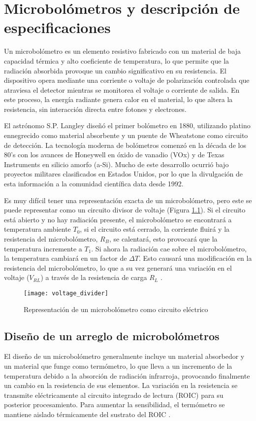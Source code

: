 \chapter{Microbolómetros y descripción de especificaciones}
Un microbolómetro es un elemento resistivo fabricado con un material de baja capacidad térmica y alto coeficiente de temperatura, lo que permite que la radiación absorbida provoque un cambio significativo en su resistencia. El dispositivo opera mediante una corriente o voltaje de polarización controlada que atraviesa el detector mientras se monitorea el voltaje o corriente de salida. En este proceso, la energía radiante genera calor en el material, lo que altera la resistencia, sin interacción directa entre fotones y electrones.


El astrónomo S.P. Langley diseñó el primer bolómetro en 1880, utilizando platino ennegrecido como material absorbente y un puente de Wheatstone como circuito de detección. La tecnología moderna de bolómetros comenzó en la década de los 80's con los avances de Honeywell en óxido de vanadio (VOx) y de Texas Instruments en silicio amorfo (a-Si). Mucho de este desarrollo ocurrió bajo proyectos militares clasificados en Estados Unidos, por lo que la divulgación de esta información a la comunidad científica data desde 1992.


Es muy difícil tener una representación exacta de un microbolómetro, pero este se puede representar como un circuito divisor de voltaje (Figura \ref{fig:voltage_divider}). Si el circuito está abierto y no hay radiación presente, el microbolómetro se encontrará a temperatura ambiente $T_{0}$, si el circuito está cerrado, la corriente fluirá y la resistencia del microbolómetro, $R_{B}$, se calentará, esto provocará que la temperatura incremente a $T_{1}$. Si ahora la radiación cae sobre el microbolómetro, la temperatura cambiará en un factor de $\Delta T$. Esto causará una modificación en la resistencia del microbolómetro, lo que a su vez generará una variación en el voltaje ($V_{RL}$) a través de la resistencia de carga $R_{L}$ \cite{Rogalski}. 

            \begin{figure}[hbtp]
                \centering
                \texttt{[image: voltage\_divider]}
                \caption{Representación de un microbolómetro como circuito eléctrico}
                \label{fig:voltage_divider}
            \end{figure} 

\section{Diseño de un arreglo de microbolómetros}
El diseño de un microbolómetro generalmente incluye un material absorbedor y un material que funge como termómetro, lo que lleva a un incremento de la temperatura debido a la absorción de radiación infrarroja, provocando finalmente un cambio en la resistencia de sus elementos. La variación en la resistencia se transmite eléctricamente al circuito integrado de lectura (ROIC) para su posterior procesamiento. Para aumentar la sensibilidad, el termómetro se mantiene aislado térmicamente del sustrato del ROIC \cite{Bhan2009}.

